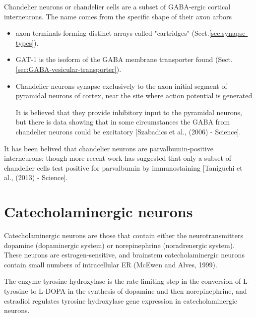 Chandelier neurons or chandelier cells are a subset of GABA-ergic cortical
interneurons.  The name comes from the specific shape of their
axon arbors
\begin{itemize}
  \item axon terminals forming distinct arrays called "cartridges"
  (Sect.\ref{sec:synapse-types}).
  
  \item GAT-1 is the isoform of the GABA membrane transporter found
  (Sect.\ref{sec:GABA-vesicular-transporter}).
  
  \item Chandelier neurons synapse exclusively to the axon initial segment of
  pyramidal neurons of cortex, near the site where action potential is generated
  
It is believed that they provide inhibitory input to the pyramidal neurons, but
there is data showing that in some circumstances the GABA from chandelier
neurons could be excitatory [Szabadics et al., (2006) - Science].
  
\end{itemize}

It has been belived that chandelier neurons are parvalbumin-positive
interneurons; though  more recent work has suggested that only a subset of
chandelier cells test positive for parvalbumin by immunostaining [Taniguchi et
al., (2013) - Science].




\section{Catecholaminergic neurons}
\label{sec:catecholaminergic-neurons}

Catecholaminergic neurons are those that contain either the neurotransmitters
dopamine (dopaminergic system) or norepinephrine (noradrenergic system). These
neurons are estrogen-sensitive, and brainstem catecholaminergic neurons contain
small numbers of intracellular ER (McEwen and Alves, 1999). 
 
 
 The enzyme tyrosine hydroxylase is the rate-limiting step in the conversion of
 L-tyrosine to L-DOPA in the synthesis of dopamine and then norepinephrine, and
 estradiol regulates tyrosine hydroxylase gene expression in catecholaminergic
 neurons.
 
